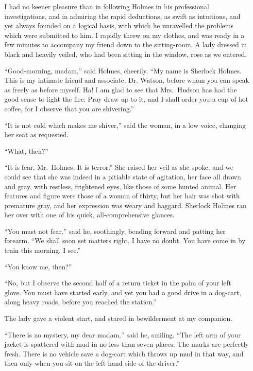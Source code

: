 I had no keener pleasure than in following Holmes in his
professional investigations, and in admiring the rapid deductions,
as swift as intuitions, and yet always founded on a logical
basis, with which he unravelled the problems which were
submitted to him. I rapidly threw on my clothes, and was
ready in a few minutes to accompany my friend down to the
sitting-room. A lady dressed in black and heavily veiled,
who had been sitting in the window, rose as we entered.

\begin{sloppypar}
“Good-morning, madam,” said Holmes, cheerily. “My
name is Sherlock Holmes. This is my intimate friend and
associate, Dr. Watson, before whom you can speak as freely
as before myself. Ha! I am glad to see that Mrs.~Hudson
has had the good sense to light the fire. Pray draw up to it,
and I shall order you a cup of hot coffee, for I observe that
you are shivering.”
\end{sloppypar}

“It is not cold which makes me shiver,” said the woman,
in a low voice, changing her seat as requested.

“What, then?”

“It is fear, Mr.~Holmes. It is terror.” She raised her
veil as she spoke, and we could see that she was indeed in a
pitiable state of agitation, her face all drawn and gray, with
restless, frightened eyes, like those of some hunted animal.
Her features and figure were those of a woman of thirty, but
her hair was shot with premature gray, and her expression
was weary and haggard. Sherlock Holmes ran her over with
one of his quick, all-comprehensive glances.

“You must not fear,” said he, soothingly, bending forward
and patting her forearm. “We shall soon set matters right,
I have no doubt. You have come in by train this morning, I
see.”

“You know me, then?”

“No, but I observe the second half of a return ticket in the
palm of your left glove. You must have started early, and
yet you had a good drive in a dog-cart, along heavy roads, before
you reached the station.”

The lady gave a violent start, and stared in bewilderment
at my companion.

“There is no mystery, my dear madam,” said he, smiling.
“The left arm of your jacket is spattered with mud in no less
than seven places. The marks are perfectly fresh. There is
no vehicle save a dog-cart which throws up mud in that way,
and then only when you sit on the left-hand side of the
driver.”

